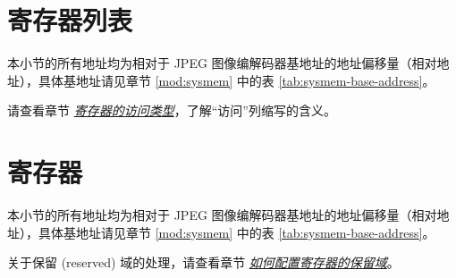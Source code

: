 \documentclass[main\_\_CN.tex]{subfiles}
\begin{document}



\newpage
\hypertarget{jpegcodec-reg-summ}{}
\section{寄存器列表}
\label{sec:jpegcodec-reg-summ}

本小节的所有地址均为相对于 JPEG 图像编解码器基地址的地址偏移量（相对地址），具体基地址请见章节 \ref{mod:sysmem} \textit{} 中的表 \ref{tab:sysmem-base-address}。

请查看章节 \hyperref[glossary-access-types]{\textit{寄存器的访问类型}}，了解“访问”列缩写的含义。






\newpage
\section{寄存器}

本小节的所有地址均为相对于 JPEG 图像编解码器基地址的地址偏移量（相对地址），具体基地址请见章节 \ref{mod:sysmem} \textit{} 中的表 \ref{tab:sysmem-base-address}。

关于保留 (reserved) 域的处理，请查看章节 \hyperref[programming-reserved-field]{\textit{如何配置寄存器的保留域}}。


\end{document}
